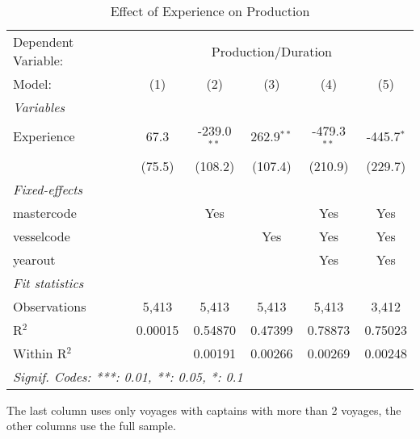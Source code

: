 
\begin{table}[htbp]
   \caption{\label{tab:n_voyage} Effect of Experience on Production}
   \centering
   \begin{tabular}{lccccc}
      \tabularnewline \midrule \midrule
      Dependent Variable: & \multicolumn{5}{c}{Production/Duration}\\
      Model:       & (1)     & (2)           & (3)          & (4)           & (5)\\  
      \midrule
      \emph{Variables}\\
      Experience   & 67.3    & -239.0$^{**}$ & 262.9$^{**}$ & -479.3$^{**}$ & -445.7$^{*}$\\   
                   & (75.5)  & (108.2)       & (107.4)      & (210.9)       & (229.7)\\   
      \midrule
      \emph{Fixed-effects}\\
      mastercode   &         & Yes           &              & Yes           & Yes\\  
      vesselcode   &         &               & Yes          & Yes           & Yes\\  
      yearout      &         &               &              & Yes           & Yes\\  
      \midrule
      \emph{Fit statistics}\\
      Observations & 5,413   & 5,413         & 5,413        & 5,413         & 3,412\\  
      R$^2$        & 0.00015 & 0.54870       & 0.47399      & 0.78873       & 0.75023\\  
      Within R$^2$ &         & 0.00191       & 0.00266      & 0.00269       & 0.00248\\  
      \midrule \midrule
      \multicolumn{6}{l}{\emph{Signif. Codes: ***: 0.01, **: 0.05, *: 0.1}}\\
   \end{tabular}
   
   \par \raggedright 
   The last column uses only voyages with captains with more than 2 voyages, the other columns use the full sample. 
\end{table}


